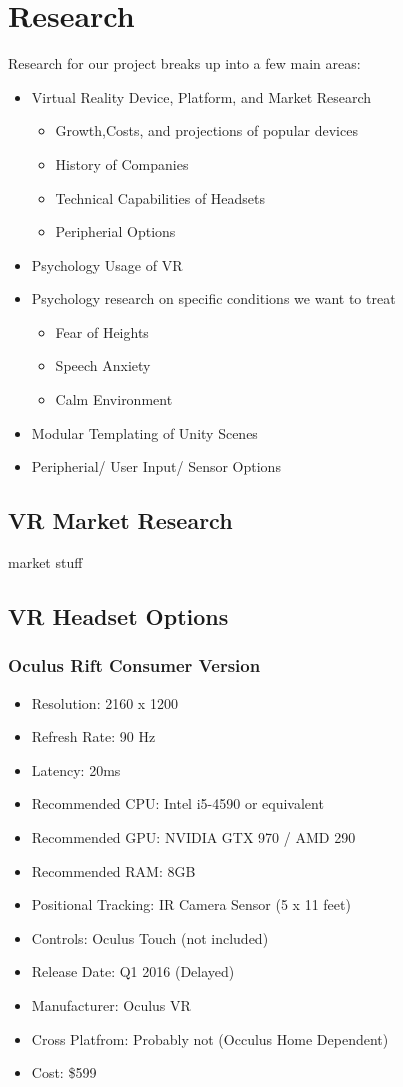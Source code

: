 \documentclass[a4paper,10pt]{article}
\begin{document}
\section{Research}
Research for our project breaks up into a few main areas:
\begin{itemize}
\item Virtual Reality Device, Platform, and Market Research
	\begin{itemize}
	\item Growth,Costs, and projections of popular devices
	\item History of Companies
	\item Technical Capabilities of Headsets
	\item Peripherial Options
	\end{itemize}
\item Psychology Usage of VR
\item Psychology research on specific conditions we want to treat
	\begin{itemize}
	\item Fear of Heights
	\item Speech Anxiety
	\item Calm Environment
	\end{itemize}
\item Modular Templating of Unity Scenes
\item Peripherial/ User Input/ Sensor Options
\end{itemize}
\pagebreak
\subsection{VR Market Research}
market stuff
\pagebreak

\subsection{VR Headset Options}

\subsubsection{Oculus Rift Consumer Version}
\begin{itemize}
 \item Resolution: 2160 x 1200
 \item Refresh Rate: 90 Hz
 \item Latency: 20ms
 \item Recommended CPU: Intel i5-4590 or equivalent
 \item Recommended GPU: NVIDIA GTX 970 / AMD 290 
 \item Recommended RAM: 8GB
 \item Positional Tracking: IR Camera Sensor (5 x 11 feet)
 \item Controls: Oculus Touch (not included)
 \item Release Date: Q1 2016 (Delayed)
 \item Manufacturer: Oculus VR
 \item Cross Platfrom: Probably not (Occulus Home Dependent)
 \item Cost: \$599
\end{itemize}
\end{document}
